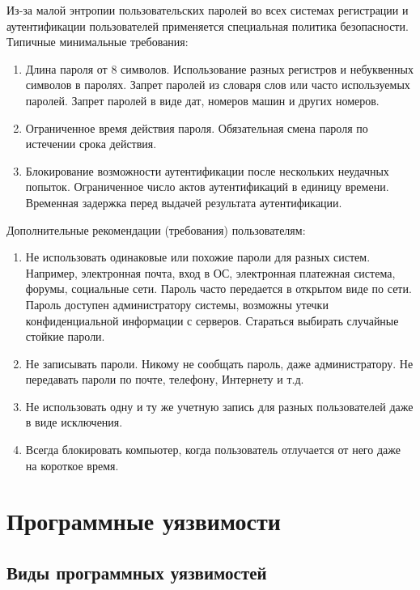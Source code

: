 \documentclass[10pt,a4paper]{book}
\begin{document}
Из-за малой энтропии пользовательских паролей во всех системах регистрации и аутентификации пользователей применяется специальная политика безопасности. Типичные минимальные требования:
\begin{enumerate}
    \item Длина пароля от 8 символов. Использование разных регистров и небуквенных символов в паролях. Запрет паролей из словаря слов или часто используемых паролей. Запрет паролей в виде дат, номеров машин и других номеров.
    \item Ограниченное время действия пароля. Обязательная смена пароля по истечении срока действия.
    \item Блокирование возможности аутентификации после нескольких неудачных попыток. Ограниченное число актов аутентификаций в единицу времени. Временная задержка перед выдачей результата аутентификации.
\end{enumerate}

Дополнительные рекомендации (требования) пользователям:
\begin{enumerate}
    \item Не использовать одинаковые или похожие пароли для разных систем. Например, электронная почта, вход в ОС, электронная платежная система, форумы, социальные сети. Пароль часто передается в открытом виде по сети. Пароль доступен администратору системы, возможны утечки конфиденциальной информации с серверов. Стараться выбирать случайные стойкие пароли.
    \item Не записывать пароли. Никому не сообщать пароль, даже администратору. Не передавать пароли по почте, телефону, Интернету и т.д.
    \item Не использовать одну и ту же учетную запись для разных пользователей даже в виде исключения.
    \item Всегда блокировать компьютер, когда пользователь отлучается от него даже на короткое время.
\end{enumerate}





\chapter{Программные уязвимости}





\section{Виды программных уязвимостей}
\end{document}
